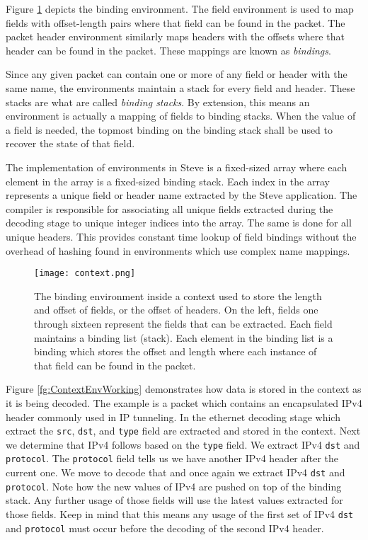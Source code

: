 Figure \ref{fg:ContextEnv} depicts the binding environment. The field environment is used to map fields with offset-length pairs where that field can be found in the packet. The packet header environment similarly maps headers with the offsets where that header can be found in the packet. These mappings are known as \textit{bindings}.

Since any given packet can contain one or more of any field or header with the same name, the environments maintain a stack for every field and header. These stacks are what are called \textit{binding stacks}. By extension, this means an environment is actually a mapping of fields to binding stacks. When the value of a field is needed, the topmost binding on the binding stack shall be used to recover the state of that field.

The implementation of environments in Steve is a fixed-sized array where each element in the array is a fixed-sized binding stack. Each index in the array represents a unique field or header name extracted by the Steve application. The compiler is responsible for associating all unique fields extracted during the decoding stage to unique integer indices into the array. The same is done for all unique headers. This provides constant time lookup of field bindings without the overhead of hashing found in environments which use complex name mappings.

\begin{figure}
\centering
		\texttt{[image: context.png]}
\caption{The binding environment inside a context used to store the length and offset of fields, or the offset of headers. On the left, fields one through sixteen represent the fields that can be extracted. Each field maintains a binding list (stack). Each element in the binding list is a binding which stores the offset and length where each instance of that field can be found in the packet. }
\label{fg:ContextEnv}
\end{figure}

Figure \ref{fg:ContextEnvWorking} demonstrates how data is stored in the context as it is being decoded. The example is a packet which contains an encapsulated IPv4 header commonly used in IP tunneling. In the ethernet decoding stage which extract the \texttt{src}, \texttt{dst}, and \texttt{type} field are extracted and stored in the context. Next we determine that IPv4 follows based on the \texttt{type} field. We extract IPv4 \texttt{dst} and \texttt{protocol}. The \texttt{protocol} field tells us we have another IPv4 header after the current one. We move to decode that and once again we extract IPv4 \texttt{dst} and \texttt{protocol}. Note how the new values of IPv4 are pushed on top of the binding stack. Any further usage of those fields will use the latest values extracted for those fields. Keep in mind that this means any usage of the first set of IPv4 \texttt{dst} and \texttt{protocol} must occur before the decoding of the second IPv4 header.\

